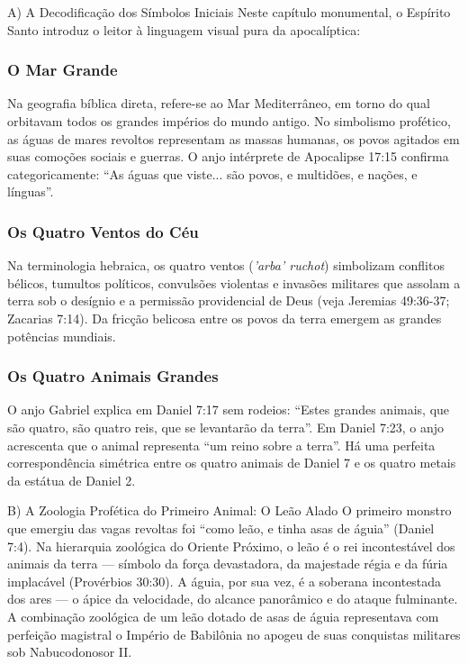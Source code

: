 \documentclass[11pt,a4paper,openany]{book}
\begin{document}
A) A Decodificação dos Símbolos Iniciais
Neste capítulo monumental, o Espírito Santo introduz o leitor à linguagem visual pura da apocalíptica:

\subsubsection*{O Mar Grande}
Na geografia bíblica direta, refere-se ao Mar Mediterrâneo, em torno do qual orbitavam todos os grandes impérios do mundo antigo. No simbolismo profético, as águas de mares revoltos representam as massas humanas, os povos agitados em suas comoções sociais e guerras. O anjo intérprete de Apocalipse 17:15 confirma categoricamente: ``As águas que viste... são povos, e multidões, e nações, e línguas''.

\subsubsection*{Os Quatro Ventos do Céu}
Na terminologia hebraica, os quatro ventos (\textit{'arba' ruchot}) simbolizam conflitos bélicos, tumultos políticos, convulsões violentas e invasões militares que assolam a terra sob o desígnio e a permissão providencial de Deus (veja Jeremias 49:36-37; Zacarias 7:14). Da fricção belicosa entre os povos da terra emergem as grandes potências mundiais.

\subsubsection*{Os Quatro Animais Grandes}
O anjo Gabriel explica em Daniel 7:17 sem rodeios: ``Estes grandes animais, que são quatro, são quatro reis, que se levantarão da terra''. Em Daniel 7:23, o anjo acrescenta que o animal representa ``um reino sobre a terra''. Há uma perfeita correspondência simétrica entre os quatro animais de Daniel 7 e os quatro metais da estátua de Daniel 2.

B) A Zoologia Profética do Primeiro Animal: O Leão Alado
O primeiro monstro que emergiu das vagas revoltas foi ``como leão, e tinha asas de águia'' (Daniel 7:4). Na hierarquia zoológica do Oriente Próximo, o leão é o rei incontestável dos animais da terra — símbolo da força devastadora, da majestade régia e da fúria implacável (Provérbios 30:30). A águia, por sua vez, é a soberana incontestada dos ares — o ápice da velocidade, do alcance panorâmico e do ataque fulminante. A combinação zoológica de um leão dotado de asas de águia representava com perfeição magistral o Império de Babilônia no apogeu de suas conquistas militares sob Nabucodonosor II.
\end{document}

